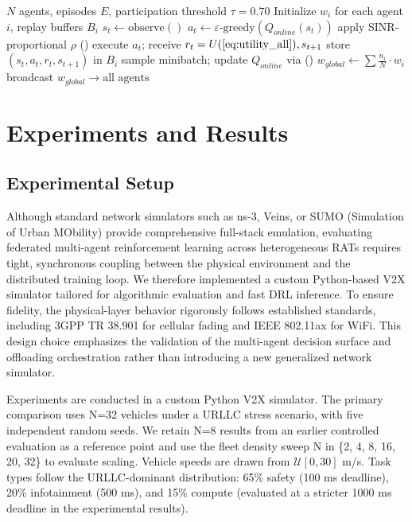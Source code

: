 \documentclass[journal,10pt,twocolumn]{IEEEtran}
\begin{document}
\begin{algorithm}[t]
\caption{MA-ROPE Training with FedAvg}
\label{alg:ma_rope}
\begin{algorithmic}[1]
\REQUIRE $N$ agents, episodes $E$, participation threshold $\tau=0.70$
\STATE Initialize $w_i$ for each agent $i$, replay buffers $B_i$
        \STATE $s_t \leftarrow \text{observe}()$ 
        \STATE $a_t \leftarrow \varepsilon\text{-greedy}(Q_{online}(s_t))$
        \STATE apply SINR-proportional $\rho$ ()
        \STATE execute $a_t$; receive $r_t = U (\text{\Cref{eq:utility_all}}), s_{t+1}$
        \STATE store $(s_t, a_t, r_t, s_{t+1})$ in $B_i$
        \STATE sample minibatch; update $Q_{online}$ via ()
    \ENDFOR
        \STATE $w_{global} \leftarrow \sum \frac{n_i}{N} \cdot w_i$ 
        \STATE broadcast $w_{global} \rightarrow \text{all agents}$
    \ENDIF
\ENDFOR
\end{algorithmic}
\end{algorithm}
\section{Experiments and Results}\label{sec:results}

\subsection{Experimental Setup}
Although standard network simulators such as ns-3, Veins, or SUMO (Simulation of Urban MObility) provide comprehensive full-stack emulation, evaluating federated multi-agent reinforcement learning across heterogeneous RATs requires tight, synchronous coupling between the physical environment and the distributed training loop. We therefore implemented a custom Python-based V2X simulator tailored for algorithmic evaluation and fast DRL inference. To ensure fidelity, the physical-layer behavior rigorously follows established standards, including 3GPP TR 38.901 for cellular fading and IEEE 802.11ax for WiFi. This design choice emphasizes the validation of the multi-agent decision surface and offloading orchestration rather than introducing a new generalized network simulator.



Experiments are conducted in a custom Python V2X simulator. The primary comparison uses N=32 vehicles under a URLLC stress scenario, with five independent random seeds. We retain N=8 results from an earlier controlled evaluation as a reference point and use the fleet density sweep N in \{2, 4, 8, 16, 20, 32\} to evaluate scaling. Vehicle speeds are drawn from $\mathcal{U}[0, 30]$ m/s. Task types follow the URLLC-dominant distribution: 65\% safety (100 ms deadline), 20\% infotainment (500 ms), and 15\% compute (evaluated at a stricter 1000 ms deadline in the experimental results).
\end{document}
